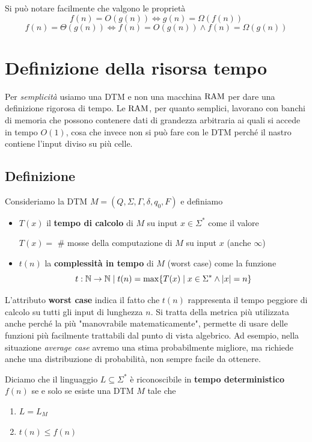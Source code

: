 Si può notare facilmente che valgono le proprietà
$$ f(n) = O(g(n)) \Leftrightarrow g(n) = \Omega(f(n)) $$
$$ f(n) = \Theta(g(n)) \Leftrightarrow f(n) = O (g(n)) \wedge f(n) = \Omega(g(n)) $$

\section{Definizione della risorsa tempo}

Per \textit{semplicità} usiamo una DTM e non una macchina $\text{RAM}$ per dare una definizione rigorosa di tempo. Le $\text{RAM}$, per quanto semplici, lavorano con banchi di memoria che possono contenere dati di grandezza arbitraria ai quali si accede in tempo $O(1)$, cosa che invece non si può fare con le DTM perché il nastro contiene l'input diviso su più celle.

\subsection{Definizione}

Consideriamo la DTM $M = (Q, \Sigma, \Gamma, \delta, q_0, F)$ e definiamo
\begin{itemize}
	\item $T(x)$ il \textbf{tempo di calcolo} di $M$ su input $x \in \Sigma^\ast$ come il valore
	\begin{center}
		$T(x) = $ \# mosse della computazione di $M$ su input $x$ (anche $\infty$)
	\end{center}
	\item $t(n)$ la \textbf{complessità in tempo} di $M$ (worst case) come la funzione
	$$ t: \mathbb{N} \rightarrow \mathbb{N} \mid t(n) = \max \{T(x) \mid x \in \Sigma^\ast \wedge |x| = n \} $$
\end{itemize}

L'attributo \textbf{worst case} indica il fatto che $t(n)$ rappresenta il tempo peggiore di calcolo su tutti gli input di lunghezza $n$. Si tratta della metrica più utilizzata anche perché la più "manovrabile matematicamente", permette di usare delle funzioni più facilmente trattabili dal punto di vista algebrico. Ad esempio, nella situazione \textit{average case} avremo una stima probabilmente migliore, ma richiede anche una distribuzione di probabilità, non sempre facile da ottenere.

Diciamo che il linguaggio $L \subseteq \Sigma^\ast$ è riconoscibile in \textbf{tempo deterministico} $f(n)$ se e solo se esiste una DTM $M$ tale che
\begin{enumerate}
	\item $L= L_M$
	\item $t(n) \leq f(n)$
\end{enumerate}

